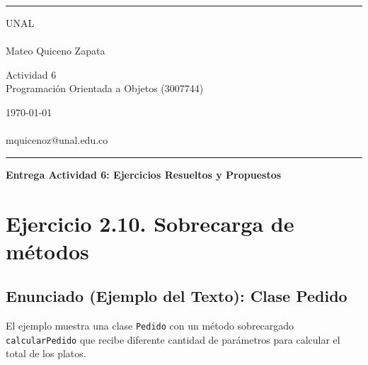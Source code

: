 \documentclass[a4paper]{article} %
\begin{document}

\fancyhead[C]{}
\hrule \medskip %
\begin{minipage}{0.295\textwidth} %
\raggedright
UNAL\\ %
\footnotesize %
\hfill\\
Mateo Quiceno Zapata
\end{minipage}
\begin{minipage}{0.4\textwidth} %
\centering 
\large %
Actividad 6\\ %
\normalsize %
Programación Orientada a Objetos (3007744)\\ %
\end{minipage}
\begin{minipage}{0.295\textwidth} %
\raggedleft
\today\\ %
\footnotesize %
\hfill\\
mquicenoz@unal.edu.co
\end{minipage}
\medskip\hrule %
\bigskip

\begin{center}
\Large\textbf{Entrega Actividad 6: Ejercicios Resueltos y Propuestos}
\end{center}
\vspace{0.5cm}


\section{Ejercicio 2.10. Sobrecarga de métodos}

\subsection{Enunciado (Ejemplo del Texto): Clase Pedido}
El ejemplo muestra una clase \texttt{Pedido} con un método sobrecargado \texttt{calcularPedido} que recibe diferente cantidad de parámetros para calcular el total de los platos.
\end{document}
